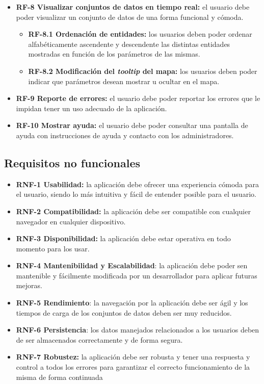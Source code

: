 \begin{itemize}
    \item \textbf{RF-8 Visualizar conjuntos de datos en tiempo real:} el usuario debe poder visualizar un conjunto de datos de una forma funcional y cómoda.
    \begin{itemize}
        \item \textbf{RF-8.1 Ordenación de entidades:} los usuarios deben poder ordenar alfabéticamente ascendente y descendente las distintas entidades mostradas en función de los parámetros de las mismas.
        \item \textbf{RF-8.2 Modificación del \textit{tooltip} del mapa:} los usuarios deben poder indicar que parámetros desean mostrar u ocultar en el mapa.
    \end{itemize}

    \item \textbf{RF-9 Reporte de errores:} el usuario debe poder reportar los errores que le impidan tener un uso adecuado de la aplicación.

    \item \textbf{RF-10 Mostrar ayuda:} el usuario debe poder consultar una pantalla de ayuda con instrucciones de ayuda y contacto con los administradores.
    
\end{itemize}

\subsection{\textbf{Requisitos no funcionales}}

\begin{itemize}
\tightlist
\item
    \textbf{RNF-1 Usabilidad:} la aplicación debe ofrecer una experiencia cómoda para el usuario, siendo lo más intuitiva y fácil de entender posible para el usuario.
\item
    \textbf{RNF-2 Compatibilidad:} la aplicación debe ser compatible con cualquier navegador en cualquier dispositivo.
\item
    \textbf{RNF-3 Disponibilidad:} la aplicación debe estar operativa en todo momento para los usar.
\item
    \textbf{RNF-4 Mantenibilidad y Escalabilidad}: la aplicación debe poder sen mantenible y fácilmente modificada por un desarrollador para aplicar futuras mejoras.
\item
    \textbf{RNF-5 Rendimiento}: la navegación por la aplicación debe ser ágil y los tiempos de carga de los conjuntos de datos deben ser muy reducidos.
\item
    \textbf{RNF-6 Persistencia}: los datos manejados relacionados a los usuarios deben de ser almacenados correctamente y de forma segura.
\item
    \textbf{RNF-7 Robustez:} la aplicación debe ser robusta y tener una respuesta y control a todos los errores para garantizar el correcto funcionamiento de la misma de forma continuada
\end{itemize}

